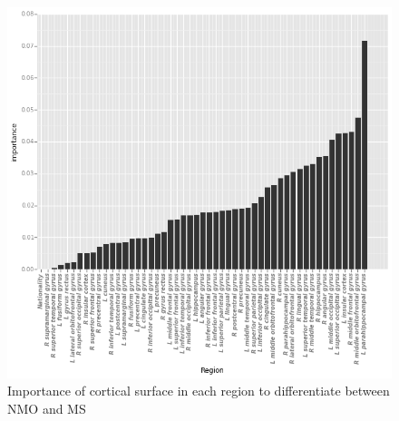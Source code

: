 \documentclass[final]{beamer}
\newlength{\onecolwid}
\newlength{\twocolwid}
\begin{document}
\begin{frame}[t]
\begin{columns}[t]
\begin{column}{\twocolwid}
\begin{columns}[t,totalwidth=\twocolwid]
\begin{column}{\onecolwid}
\begin{figure}
\includegraphics[width=0.7\linewidth]{v3_surface_importance.png}
\caption{Importance of cortical surface in each region to differentiate between NMO and MS}
\end{figure}




\end{column} %

\end{columns} %



\begin{columns}[t,totalwidth=\twocolwid] %

\begin{column}{\onecolwid} %



\end{column} %

\begin{column}{\onecolwid} %




\end{column}
\end{columns}
\end{column}
\end{columns}
\end{frame}
\end{document}
